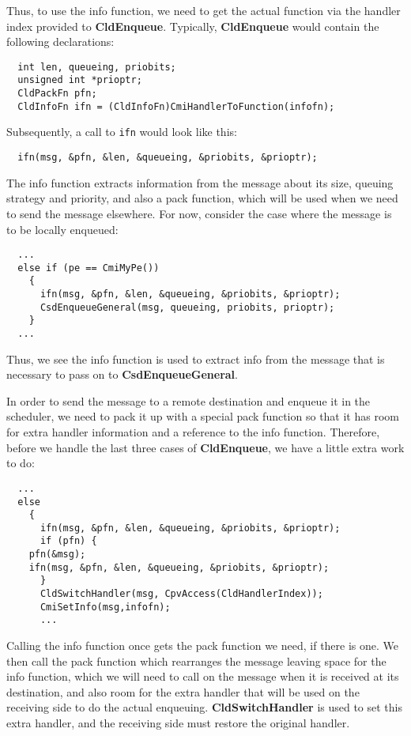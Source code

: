 \documentclass[11pt]{article}
\begin{document}

Thus, to use the info function, we need to get the actual function via
the handler index provided to {\bf CldEnqueue}.  Typically, {\bf
CldEnqueue} would contain the following declarations:

\begin{verbatim}
  int len, queueing, priobits; 
  unsigned int *prioptr;
  CldPackFn pfn;
  CldInfoFn ifn = (CldInfoFn)CmiHandlerToFunction(infofn);
\end{verbatim}

\noindent Subsequently, a call to {\tt ifn} would look like this:

\begin{verbatim}
  ifn(msg, &pfn, &len, &queueing, &priobits, &prioptr);
\end{verbatim}

The info function extracts information from the message about its size,
queuing strategy and priority, and also a pack function, which will be
used when we need to send the message elsewhere.  For now, consider
the case where the message is to be locally enqueued:

\begin{verbatim}
  ...
  else if (pe == CmiMyPe())
    {
      ifn(msg, &pfn, &len, &queueing, &priobits, &prioptr);
      CsdEnqueueGeneral(msg, queueing, priobits, prioptr);
    }
  ...
\end{verbatim}

Thus, we see the info function is used to extract info from the
message that is necessary to pass on to {\bf CsdEnqueueGeneral}.

In order to send the message to a remote destination and enqueue it in
the scheduler, we need to pack it up with a special pack function so
that it has room for extra handler information and a reference to the
info function.  Therefore, before we handle the last three cases of
{\bf CldEnqueue}, we have a little extra work to do:

\begin{verbatim}
  ...
  else
    {
      ifn(msg, &pfn, &len, &queueing, &priobits, &prioptr);
      if (pfn) {
	pfn(&msg);
	ifn(msg, &pfn, &len, &queueing, &priobits, &prioptr);
      }
      CldSwitchHandler(msg, CpvAccess(CldHandlerIndex));
      CmiSetInfo(msg,infofn);
      ...
\end{verbatim}

Calling the info function once gets the pack function we need, if
there is one.  We then call the pack function which rearranges the
message leaving space for the info function, which we will need to
call on the message when it is received at its destination, and also
room for the extra handler that will be used on the receiving side to
do the actual enqueuing.  {\bf CldSwitchHandler} is used to set this extra
handler, and the receiving side must restore the original handler.
\end{document}

